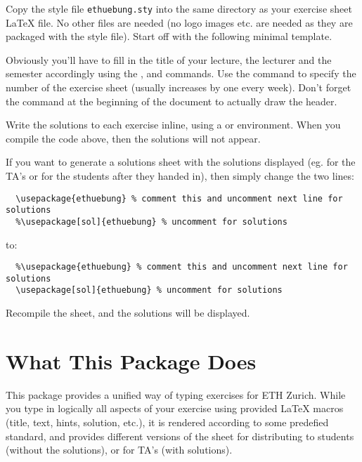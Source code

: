 \documentclass[11pt,a4paper]{article}
\begin{document}
Copy the style file \texttt{ethuebung.sty} into the same directory as your exercise sheet
\LaTeX{} file. No other files are needed (no logo images etc. are needed as they are
packaged with the style file). Start off with the following minimal template.

\begin{pkgverbatim}%
\end{pkgverbatim}

Obviously you'll have to fill in the title of your lecture, the lecturer and the semester
accordingly using the ,  and
 commands. Use the  command to specify
the number of the exercise sheet (usually increases by one every week). Don't forget the
 command at the beginning of the document to actually draw the header.

Write the solutions to each exercise inline, using a  or 
environment. When you compile the code above, then the solutions will not appear.

If you want to generate a solutions sheet with the solutions displayed (eg. for the TA's
or for the students after they handed in), then simply change the two lines:
\begin{verbatim}
  \usepackage{ethuebung} % comment this and uncomment next line for solutions
  %\usepackage[sol]{ethuebung} % uncomment for solutions
\end{verbatim}
to:
\begin{verbatim}
  %\usepackage{ethuebung} % comment this and uncomment next line for solutions
  \usepackage[sol]{ethuebung} % uncomment for solutions
\end{verbatim}

Recompile the sheet, and the solutions will be displayed.


\section{What This Package Does}

This package provides a unified way of typing exercises for ETH Zurich. While you type in
logically all aspects of your exercise using provided \LaTeX{} macros (title, text, hints,
solution, etc.), it is rendered according to some predefied standard, and provides
different versions of the sheet for distributing to students (without the solutions), or
for TA's (with solutions).
\end{document}
